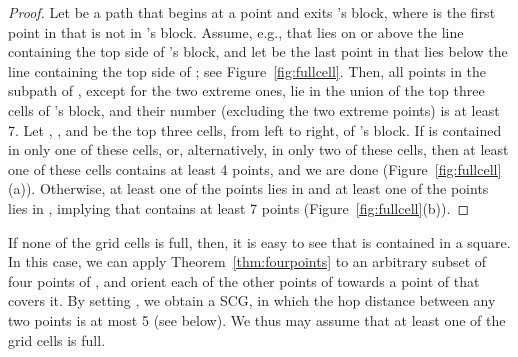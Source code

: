 \documentclass[11pt,letter]{article}
\newcommand{\old}[1]{{{}}}
\begin{document}
\begin{proof}


\old{
Observe that since each cell is a semi-open square of side length , then any path connecting two non-neighboring cells
contains at least  middle-points.
Now, let  be a path that begins at a point 
and exits the block of , where  is the first point along  not in 's block.
Assume, e.g., that  lies above 's block,
and let  be the first point along  for which the points  all lie above the cell .
By our observation at the beginning of the proof,  (clearly , and  and  lies in non-neighboring cells).
Let , , and 
be the top cells in the block of , left to right,
then .
If these (at least ) points lies in one or in two of the three cells, then at least one cell contains at least  points, namely is full.
Otherwise, there exists a subpath of  that connects a point in  with a point in .
By our observation at the beginning of the proof,
such a path contains at least  middle-points lying in , implying that  in this case is full.
}

Let  be a path that begins at a point 
and exits 's block, where  is the first point in  that is not in 's block.
Assume, e.g., that  lies on or above the line containing the top side of 's block,
and let  be the last point in  that lies below the line containing the top side of ; see Figure~\ref{fig:fullcell}.
Then, all points in the subpath
 of , except for the two extreme ones, lie in the union of the top three cells of 's block, and their number (excluding the two extreme points) is at least 7. Let , , and  be the top three cells, from left to right, of 's block. If  is contained in only one of these cells, or, alternatively, in only two of these cells, then at least one of these cells contains at least 4 points, and we are done (Figure~\ref{fig:fullcell}(a)). Otherwise, at least one of the points lies in  and at least one of the points lies in , implying that  contains at least 7 points (Figure~\ref{fig:fullcell}(b)).



\end{proof}


If none of the grid cells is full, then, it is easy to see that  is contained in a  square. In this case, we can apply Theorem~\ref{thm:fourpoints} to an arbitrary subset  of four points of , and orient each of the other points of  towards a point of  that covers it. By setting , we obtain a SCG, in which the hop distance between any two points is at most 5 (see below).
We thus may assume that at least one of the grid cells is full.
\end{document}
